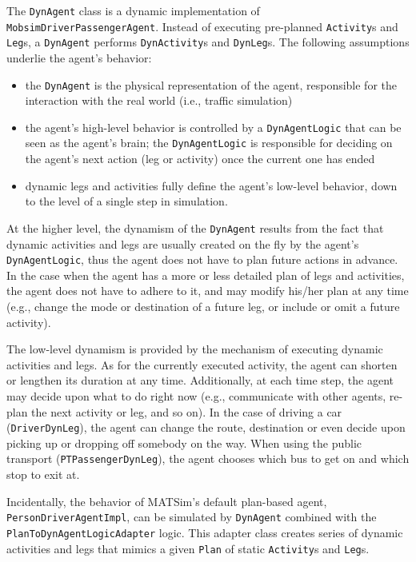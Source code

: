 The \lstinline$DynAgent$ class is a dynamic implementation of \lstinline$MobsimDriverPassengerAgent$. Instead of executing pre-planned \lstinline$Activity$s and \lstinline$Leg$s, a \lstinline$DynAgent$ performs \lstinline$DynActivity$s and \lstinline$DynLeg$s. The following assumptions underlie the agent's behavior:
%
\begin{itemize}
	\item the \lstinline$DynAgent$ is the physical representation of the agent, responsible for the interaction with the real world (i.e., traffic simulation)

	\item the agent's high-level behavior is controlled by a \lstinline$DynAgentLogic$ that can be seen as the agent's brain; the \lstinline$DynAgentLogic$ is responsible for deciding on the agent's next action (leg or activity) once the current one has ended
	
	\item dynamic legs and activities fully define the agent's low-level behavior, down to the level of a single step in simulation.
\end{itemize}
%
At the higher level, the dynamism of the \lstinline$DynAgent$ results from the fact that dynamic activities and legs are usually created on the fly by the agent's \lstinline$DynAgentLogic$, thus the agent does not have to plan future actions in advance. In the case when the agent has a more or less detailed plan of legs and activities, the agent does not have to adhere to it, and may modify his/her plan at any time (e.g., change the mode or destination of a future leg, or include or omit a future activity).

The low-level dynamism is provided by the mechanism of executing dynamic activities and legs. As for the currently executed activity, the agent can shorten or lengthen its duration at any time. Additionally, at each time step, the agent may decide upon what to do right now (e.g., communicate with other agents, re-plan the next activity or leg, and so on). In the case of driving a car (\lstinline$DriverDynLeg$), the agent can change the route, destination or even decide upon picking up or dropping off somebody on the way. When using the public transport (\lstinline$PTPassengerDynLeg$), the agent chooses which bus to get on and which stop to exit at.

Incidentally, the behavior of MATSim's default plan-based agent, \lstinline$PersonDriverAgentImpl$, can be simulated by \lstinline$DynAgent$ combined with the \lstinline$PlanToDynAgentLogicAdapter$ logic. This adapter class creates series of dynamic activities and legs that mimics a given \lstinline$Plan$ of static \lstinline$Activity$s and \lstinline$Leg$s.

